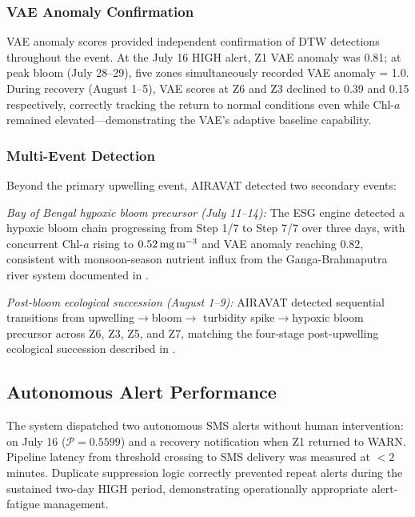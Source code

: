 \documentclass[journal]{IEEEtran}
\begin{document}
\subsubsection{VAE Anomaly Confirmation}

VAE anomaly scores provided independent confirmation of DTW
detections throughout the event. At the July 16 HIGH alert, Z1 VAE
anomaly was 0.81; at peak bloom (July 28--29), five zones
simultaneously recorded VAE anomaly = 1.0. During recovery
(August 1--5), VAE scores at Z6 and Z3 declined to 0.39 and 0.15
respectively, correctly tracking the return to normal conditions even
while Chl-$a$ remained elevated---demonstrating the VAE's adaptive
baseline capability.

\subsubsection{Multi-Event Detection}

Beyond the primary upwelling event, AIRAVAT detected two secondary
events:

\textit{Bay of Bengal hypoxic bloom precursor (July 11--14):}
The ESG engine detected a hypoxic bloom chain progressing from
Step 1/7 to Step 7/7 over three days, with concurrent Chl-$a$
rising to $0.52\,\text{mg\,m}^{-3}$ and VAE anomaly reaching 0.82,
consistent with monsoon-season nutrient influx from the Ganga-Brahmaputra
river system documented in \cite{kumar2002}.

\textit{Post-bloom ecological succession (August 1--9):}
AIRAVAT detected sequential transitions from upwelling$\to$bloom$\to$
turbidity spike$\to$hypoxic bloom precursor across Z6, Z3, Z5, and Z7,
matching the four-stage post-upwelling ecological succession described
in \cite{nair1994}.

\subsection{Autonomous Alert Performance}

The system dispatched two autonomous SMS alerts without human
intervention: on July 16 ($\mathcal{P} = 0.5599$) and a recovery
notification when Z1 returned to WARN. Pipeline latency from threshold
crossing to SMS delivery was measured at $< 2$ minutes. Duplicate
suppression logic correctly prevented repeat alerts during the
sustained two-day HIGH period, demonstrating operationally appropriate
alert-fatigue management.

\end{document}
